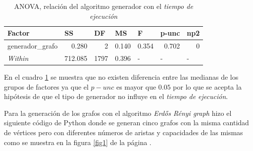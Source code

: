 \documentclass{article}
\begin{document}
\begin{table}[htbp]
  \centering
  \caption{ANOVA, relación del algoritmo generador con el \textit{tiempo de ejecución}}
    \begin{tabular}{lrrrlll}
    \toprule
    \textbf{Factor} & \multicolumn{1}{l}{\textbf{SS}} & \multicolumn{1}{l}{\textbf{DF}} & \multicolumn{1}{l}{\textbf{MS}} & \textbf{F} & \textbf{p-unc} & \textbf{np2} \\
    \midrule
    generador\_grafo & 0.280 & 2     & 0.140 & \multicolumn{1}{r}{0.354} & \multicolumn{1}{r}{0.702} & \multicolumn{1}{r}{0} \\
    \textit{Within} & 712.085 & 1797  & 0.396 & -     & -     & - \\
    \bottomrule
    \end{tabular}%
  \label{tab:t2}%
\end{table}%
En el cuadro \ref{tab:t2} se muestra que no existen diferencia entre las medianas de los grupos de factores ya que el $p-unc$ es mayor que $0.05$ por lo que se acepta la hipótesis de que el tipo de generador no influye en el \textit{tiempo de ejecución}.

Para la generación de los grafos con el algoritmo \textit{Erdős Rényi graph} hizo el siguiente código de Python donde  se generan  cinco grafos con la misma cantidad de vértices pero con diferentes números de aristas y capacidades de las mismas como se muestra en la figura \ref{fig1} de la página \pageref{fig1}.

\begin{center}

\end{center} 
   
\end{document}
